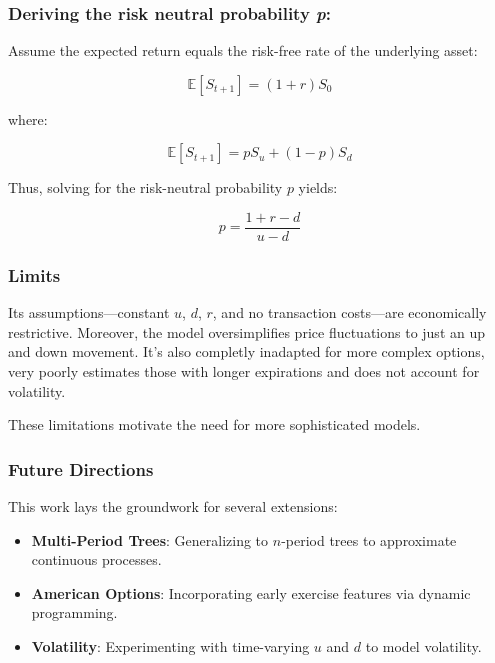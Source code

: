 \documentclass{article}
\begin{document}
    \bigskip

    \subsubsection*{Deriving the risk neutral probability \emph{p}:}

    Assume the expected return equals the risk-free rate of the underlying asset:

    \[
        \mathbb{E}[S_{t+1}] = (1 + r) S_0
    \]


    where:

    \[
        \mathbb{E}[S_{t+1}] = p S_u + (1 - p) S_d
    \]

    Thus, solving for the risk-neutral probability \(p\) yields:

    \begin{equation}
        \label{eq:risk_neutral_prob_discrete}
        p = \frac{1 + r - d}{u - d}
    \end{equation}

    \subsubsection{Limits}

    Its assumptions---constant \( u \), \( d \), \( r \), and no transaction costs---are economically restrictive.
    Moreover, the model oversimplifies price fluctuations to just an up and down movement.
    It's also completly inadapted for more complex options, very poorly estimates those with longer expirations and does not account for volatility.

    \medskip

    These limitations motivate the need for more sophisticated models.

    \subsubsection{Future Directions}

    This work lays the groundwork for several extensions:

    \begin{itemize}
        \item \textbf{Multi-Period Trees}: Generalizing to \( n \)-period trees to approximate continuous processes.
        \item \textbf{American Options}: Incorporating early exercise features via dynamic programming.
        \item \textbf{Volatility}: Experimenting with time-varying \( u \) and \( d \) to model volatility.
    \end{itemize}
\end{document}
